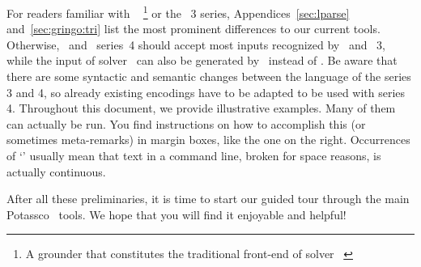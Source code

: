 For readers familiar with \lparse~\cite{lparseManual}%
\footnote{A grounder that constitutes the traditional front-end of solver \smodels~\cite{siniso02a}}
or the \gringo~3 series,
Appendices~\ref{sec:lparse} and~\ref{sec:gringo:tri}
list the most prominent differences to our current tools.
Otherwise, \gringo\ and \clingo\ series~4 should accept most inputs recognized by \lparse\ and \gringo~3,
while the input of solver \clasp\ can also be generated by \lparse\ instead of \gringo.
Be aware that there are some syntactic and semantic changes between the language of the series 3 and 4,
so already existing encodings have to be adapted to be used with series 4.
Throughout this document, we provide illustrative examples.
Many of them can actually be run. 
You find instructions on how to accomplish this
(or sometimes meta-remarks)
in margin boxes, like the one on the right.
Occurrences of `'
usually mean that text in a command line, broken for space reasons, is actually continuous.

After all these preliminaries, it is time to start our guided tour
through the main Potassco~\cite{potassco} tools.
We hope that you will find it enjoyable and helpful!

